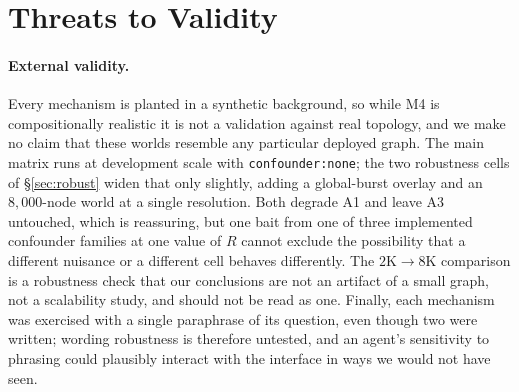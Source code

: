 \documentclass[sigconf,anonymous,review]{acmart}
\begin{document}
\section{Threats to Validity}
\label{sec:threats}

\paragraph{External validity.}
Every mechanism is planted in a synthetic background, so while M4 is compositionally realistic it
is not a validation against real topology, and we make no claim that these worlds resemble any
particular deployed graph. The main matrix runs at development scale with
\texttt{confounder:none}; the two robustness cells of \S\ref{sec:robust} widen that only slightly,
adding a global-burst overlay and an $8{,}000$-node world at a single resolution. Both degrade A1
and leave A3 untouched, which is reassuring, but one bait from one of three implemented confounder
families at one value of $R$ cannot exclude the possibility that a different nuisance or a
different cell behaves differently. The $2\text{K}\to8\text{K}$ comparison is a robustness check
that our conclusions are not an artifact of a small graph, not a scalability study, and should not
be read as one. Finally, each mechanism was exercised with a single paraphrase of its question,
even though two were written; wording robustness is therefore untested, and an agent's sensitivity
to phrasing could plausibly interact with the interface in ways we would not have seen.
\end{document}
